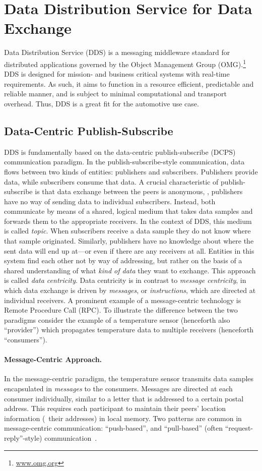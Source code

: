 \section{Data Distribution Service for Data Exchange}
Data Distribution Service (DDS) is a messaging middleware standard \cite{dds-1.4-standard} for distributed applications governed by the Object Management Group (OMG).\footnote{\url{www.omg.org}} DDS is designed for mission- and business critical systems with real-time requirements. As such, it aims to function in a resource efficient, predictable and reliable manner, and is subject to minimal computational and transport overhead.
Thus, DDS is a great fit for the automotive use case. 

\subsection{Data-Centric Publish-Subscribe}
DDS is fundamentally based on the data-centric publish-subscribe (DCPS) communication paradigm. In the publish-subscribe-style communication, data flows between two kinds of entities: publishers and subscribers. Publishers provide data, while subscribers consume that data. A crucial characteristic of publish-subscribe is that data exchange between the peers is anonymous, \ie , publishers have no way of sending data to individual subscribers. Instead, both communicate by means of a shared, logical medium that takes data samples and forwards them to the appropriate receivers. In the context of DDS, this medium is called \emph{topic}. When subscribers receive a data sample they do not know where that sample originated. Similarly, publishers have no knowledge about where the sent data will end up at---or even if there are any receivers at all. Entities in this system find each other not by way of addressing, but rather on the basis of a shared understanding of what \emph{kind of data} they want to exchange. This approach is called \emph{data centricity}. Data centricity is in contrast to \emph{message centricity}, in which data exchange is driven by \emph{messages}, or \emph{instructions}, which are directed at individual receivers. A prominent example of a message-centric technology is Remote Procedure Call (RPC). To illustrate the difference between the two paradigms consider the example of a temperature sensor (henceforth also ``provider'') which propagates temperature data to multiple receivers (henceforth ``consumers'').

\paragraph{Message-Centric Approach.} In the message-centric paradigm, the temperature sensor transmits data samples encapsulated in \emph{messages} to the consumers. Messages are directed at each consumer individually, similar to a letter that is addressed to a certain postal address. This requires each participant to maintain their peers' location information (\ie\ their addresses) in local memory.
Two patterns are common in message-centric communication: ``push-based'', and ``pull-based'' (often ``request-reply''-style) communication~\cite{tanenbaum2017distributed}.

